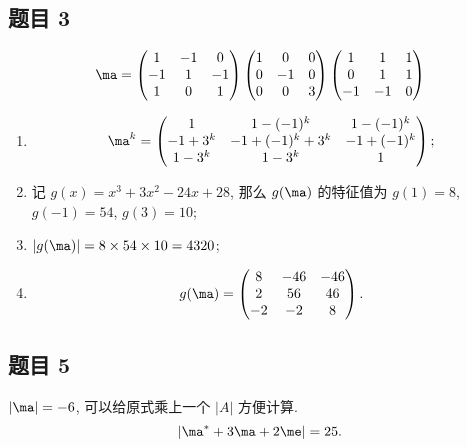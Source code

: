 \subsection*{ 题目 3 }
\begin{solution}
    \[
    \ma = \left(\begin{matrix}
        1 & -1 & 0 \\
        -1 & 1 & -1 \\
        1 & 0 & 1
        \end{matrix}\right)
        \left(\begin{matrix}
            1 & 0 & 0 \\
            0 & -1 & 0 \\
            0 & 0 & 3
        \end{matrix}\right)
        \left(\begin{matrix}
            1 & 1 & 1 \\
            0 & 1 & 1 \\
            -1 & -1 & 0
        \end{matrix}\right)
    \]
\begin{enumerate}
    \item \[
    \ma^k = \begin{pmatrix}
        1 & 1 - (-1)^k & 1 - (-1)^k \\
        -1 + 3^k & -1 + (-1)^k + 3^k & -1 + (-1)^k \\
        1 - 3^k & 1 - 3^k & 1
    \end{pmatrix};
    \] 
    \item 记 $g(x) = x^3 + 3x^2 - 24x + 28$, 那么 $g(\ma)$ 的特征值为 $g(1) = 8$, $g(-1) = 54$, $g(3) = 10$;
    \item $|g(\ma)| = 8 \times 54 \times 10 = 4320$;
    \item \[
    g(\ma) = \begin{pmatrix}
        8 & -46 & -46 \\
        2 & 56 & 46 \\
        -2 & -2 & 8
    \end{pmatrix}.
    \]
\end{enumerate}
\end{solution}

\subsection*{ 题目 5 }
\begin{solution}
$|\ma| = -6$, 可以给原式乘上一个 $|A|$ 方便计算. 
\[
    |\ma^\ast + 3\ma + 2\me| = 25.
\]
\end{solution}

